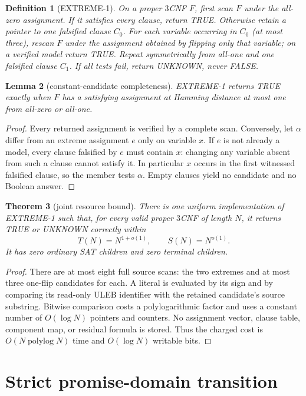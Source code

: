 \documentclass[11pt]{article}
\newtheorem{theorem}{Theorem}
\newtheorem{lemma}[theorem]{Lemma}
\newtheorem{definition}[theorem]{Definition}
\begin{document}
\begin{definition}[\textsc{EXTREME-1}]
On a proper $3$CNF $F$, first scan $F$ under the all-zero assignment.  If it
satisfies every clause, return TRUE.  Otherwise retain a pointer to one
falsified clause $C_0$.  For each variable occurring in $C_0$ (at most three),
rescan $F$ under the assignment obtained by flipping only that variable; on a
verified model return TRUE.  Repeat symmetrically from all-one and one
falsified clause $C_1$.  If all tests fail, return UNKNOWN, never FALSE.
\end{definition}

\begin{lemma}[constant-candidate completeness]
\textsc{EXTREME-1} returns TRUE exactly when $F$ has a satisfying assignment
at Hamming distance at most one from all-zero or all-one.
\end{lemma}
\begin{proof}
Every returned assignment is verified by a complete scan.  Conversely, let
$\alpha$ differ from an extreme assignment $e$ only on variable $x$.  If $e$
is not already a model, every clause falsified by $e$ must contain $x$:
changing any variable absent from such a clause cannot satisfy it.  In
particular $x$ occurs in the first witnessed falsified clause, so the member
tests $\alpha$.  Empty clauses yield no candidate and no Boolean answer.
\end{proof}

\begin{theorem}[joint resource bound]
There is one uniform implementation of \textsc{EXTREME-1} such that, for
every valid proper $3$CNF of length $N$, it returns TRUE or UNKNOWN correctly
within
\[
  T(N)=N^{1+o(1)},\qquad S(N)=N^{o(1)}.
\]
It has zero ordinary SAT children and zero terminal children.
\end{theorem}
\begin{proof}
There are at most eight full source scans: the two extremes and at most three
one-flip candidates for each.  A literal is evaluated by its sign and by
comparing its read-only ULEB identifier with the retained candidate's source
substring.  Bitwise comparison costs a polylogarithmic factor and uses a
constant number of $O(\log N)$ pointers and counters.  No assignment vector,
clause table, component map, or residual formula is stored.  Thus the charged
cost is $O(N\operatorname{polylog}N)$ time and $O(\log N)$ writable bits.
\end{proof}

\section{Strict promise-domain transition}
\end{document}
